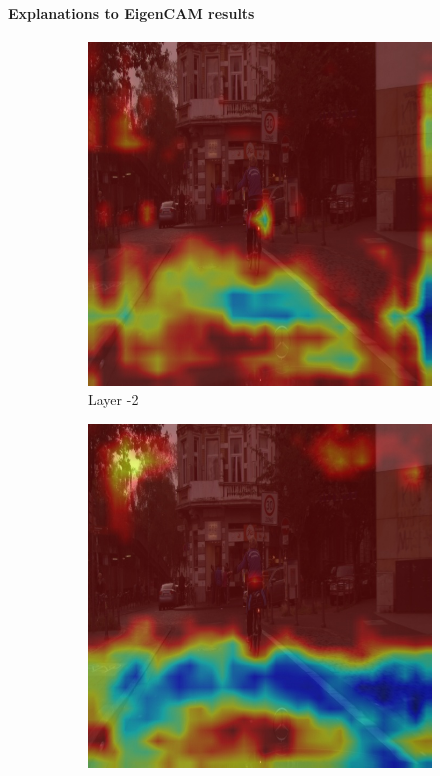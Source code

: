 \paragraph{Explanations to EigenCAM results}
\begin{figure}[h!]
    \centering


    \begin{subfigure}[b]{0.49\textwidth}
        \centering
        \includegraphics[width=\textwidth]{figures/bonn_000036_000019_leftImg8bit.pnglayer-2/bonn_000036_000019_leftImg8bit.png_object(0)_heatmap}
        \caption{Layer -2}
        \label{fig:b-2}
    \end{subfigure}
    \hfill
    \begin{subfigure}[b]{0.49\textwidth}
        \centering
        \includegraphics[width=\textwidth]{figures/bonn_000036_000019_leftImg8bit.pnglayer-3/bonn_000036_000019_leftImg8bit.png_object(0)_heatmap}

\end{subfigure}
\end{figure}
